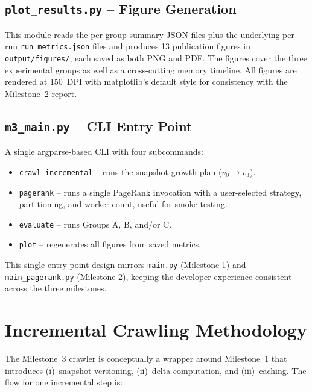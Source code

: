 \documentclass[11pt,a4paper]{article}
\begin{document}
\subsection{\texttt{plot\_results.py} -- Figure Generation}
This module reads the per-group summary JSON files plus the underlying
per-run \texttt{run\_metrics.json} files and produces 13 publication
figures in \texttt{output/figures/}, each saved as both PNG and PDF.
The figures cover the three experimental groups as well as a
cross-cutting memory timeline. All figures are rendered at 150~DPI with
matplotlib's default style for consistency with the Milestone~2 report.

\subsection{\texttt{m3\_main.py} -- CLI Entry Point}
A single argparse-based CLI with four subcommands:
\begin{itemize}
    \item \texttt{crawl-incremental} -- runs the snapshot growth plan
    ($v_0 \to v_3$).
    \item \texttt{pagerank} -- runs a single PageRank invocation with a
    user-selected strategy, partitioning, and worker count, useful for
    smoke-testing.
    \item \texttt{evaluate} -- runs Groups A, B, and/or C.
    \item \texttt{plot} -- regenerates all figures from saved metrics.
\end{itemize}

This single-entry-point design mirrors \texttt{main.py} (Milestone 1) and
\texttt{main\_pagerank.py} (Milestone 2), keeping the developer
experience consistent across the three milestones.

\section{Incremental Crawling Methodology}
\label{sec:crawl-methodology}

The Milestone~3 crawler is conceptually a wrapper around Milestone~1
that introduces (i)~snapshot versioning, (ii)~delta computation, and
(iii)~caching. The flow for one incremental step is:
\end{document}
